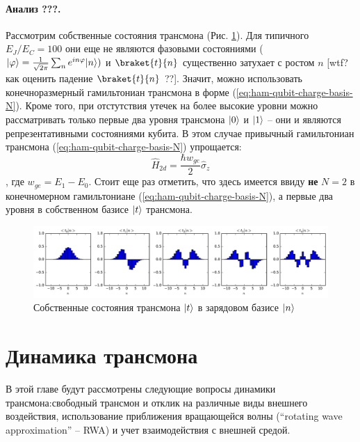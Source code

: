 \documentclass[12pt, twoside]{report}
\DeclarePairedDelimiter\ket{\lvert}{\rangle}
\numberwithin{equation}{section}
\numberwithin{figure}{section}
\begin{document}
\paragraph{Анализ ???.} Рассмотрим собственные состояния трансмона (Рис. \ref{fig:transmon-eigenstates}). Для типичного $E_J / E_C = 100$ они еще не являются фазовыми состояниями ($\ket{\varphi} = \frac{1}{\sqrt{2 \pi}} \sum_n e^{i n \varphi} \ket{n}) $ и $\braket{t}{n}$ существенно затухает с ростом $n$ [wtf? как оценить падение $\braket{t}{n}$ ??]. Значит, можно использовать конечноразмерный гамильтониан трансмона в форме (\ref{eq:ham-qubit-charge-basis-N}). Кроме того, при отстутствия утечек на более высокие уровни можно рассматривать только первые два уровня трансмона $\ket{0}$ и $\ket{1}$ -- они и являются репрезентативными состояниями кубита. В этом случае привычный гамильтониан трансмона (\ref{eq:ham-qubit-charge-basis-N}) упрощается:
\begin{equation}
\hat{H}_{2d} = \frac{\hbar w_{ge}}{2} \hat{\sigma}_z
\label{eq:ham-qubit-2d}
\end{equation}
, где $w_{ge} = E_1 - E_0$. Стоит еще раз отметить, что здесь имеется ввиду \textbf{не} $N = 2$ в конечномерном гамильтониане (\ref{eq:ham-qubit-charge-basis-N}), а первые два уровня в собственном базисе $\ket{t}$ трансмона.
\begin{figure}[!h]
\centering
\includegraphics[width=1\textwidth]{Pictures2/transmon_eigenstates}
\caption{Собственные состояния трансмона $\ket{t}$ в зарядовом базисе $\ket{n}$}
\label{fig:transmon-eigenstates}
\end{figure}


\section{Динамика трансмона}
В этой главе будут рассмотрены следующие вопросы динамики трансмона:свободный трансмон и отклик на различные виды внешнего воздействия, использование приближения вращающейся волны (``rotating wave approximation'' -- RWA)  и учет взаимодействия с внешней средой.
\end{document}
